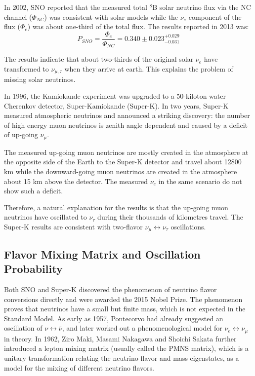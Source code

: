 \documentclass[preprint,12pt]{elsarticle}
\numberwithin{equation}{section}
\begin{document}
In 2002, SNO reported that the measured total $^8$B solar neutrino flux via the NC channel ($\Phi_{NC}$) was consistent with solar models while the $\nu_e$ component of the flux ($\Phi_e$) was about one-third of the total flux\cite{SNO}. The results reported in 2013 was\cite{SNOresult}:
\[
P_{SNO} = \frac{\Phi_e}{\Phi_{NC}}= 0.340\pm0.023^{+0.029}_{-0.031}
\]

The results indicate that about two-thirds of the original solar $\nu_e$ have transformed to $\nu_{\mu,\tau}$ when they arrive at earth. This explains the problem of missing solar neutrinos.

In 1996, the Kamiokande experiment was upgraded to a 50-kiloton water Cherenkov detector, Super-Kamiokande (Super-K). In two years, Super-K measured atmospheric neutrinos and announced a striking discovery: the number of high energy muon neutrinos is zenith angle dependent and caused by a deficit of up-going $\nu_\mu$\cite{superK}. 

The measured up-going muon neutrinos are mostly created in the atmosphere at the opposite side of the Earth to the Super-K detector and travel about 12800 km while the downward-going muon neutrinos are created in the atmosphere about 15 km above the detector. The measured $\nu_e$ in the same scenario do not show such a deficit\cite{superK}.

Therefore, a natural explanation for the results is that the up-going muon neutrinos have oscillated to $\nu_\tau$ during their thousands of kilometres travel. The Super-K results are consistent with two-flavor $\nu_\mu\leftrightarrow\nu_\tau$ oscillations\cite{superK}.


\subsection{Flavor Mixing Matrix and Oscillation Probability}
Both SNO and Super-K discovered the phenomenon of neutrino flavor conversions directly and were awarded the 2015 Nobel Prize. The phenomenon proves that neutrinos have a small but finite mass, which is not expected in the Standard Model. As early as 1957, Pontecorvo had already suggested an oscillation of $\nu\leftrightarrow\bar{\nu}$, and later worked out a phenomenological model for $\nu_e\leftrightarrow\nu_\mu$ in theory\cite{nobeldoc}. In 1962, Ziro Maki, Masami Nakagawa and Shoichi Sakata further introduced a lepton mixing matrix (usually called the PMNS matrix), which is a unitary transformation relating the neutrino flavor and mass eigenstates, as a model for the mixing of different neutrino flavors\cite{oxfordneutrino}.
\end{document}
